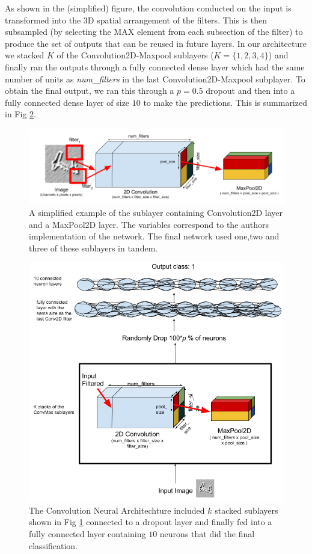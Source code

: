 \documentclass[conference]{IEEEtran}
\begin{document}
As shown in the (simplified) figure, the convolution conducted on the input is transformed into the 3D spatial arrangement of the filters. This is then subsampled (by selecting the MAX element from each subsection of the filter) to produce the set of outputs that can be reused in future layers. In our architecture we stacked $K$ of the Convolution2D-Maxpool sublayers ($K=\{1,2,3,4\}$) and finally ran the outputs through a fully connected dense layer which had the same number of units as \emph{num\_filters} in the last Convolution2D-Maxpool subplayer. To obtain the final output, we ran this through a $p=0.5$ dropout and then into a fully connected dense layer of size $10$ to make the predictions. This is summarized in Fig \ref{CNNarch}. 

\begin{figure}[h]
	\includegraphics[scale=0.30]{convnet_example.png}
	\caption{A simplified example of the sublayer containing Convolution2D layer and a MaxPool2D layer. The variables correspond to the authors implementation of the network. The final network used one,two and three of these sublayers in tandem.}
	\label{convmaxlayer}
\end{figure}


\begin{figure}[h]
	\includegraphics[scale=0.30]{architecture.png}
	\caption{The Convolution Neural Architechture included $k$ stacked sublayers shown in Fig \ref{convmaxlayer} connected to a dropout layer and finally fed into a fully connected layer containing $10$ neurons that did the final classification.}
	\label{CNNarch}
\end{figure}
\end{document}

